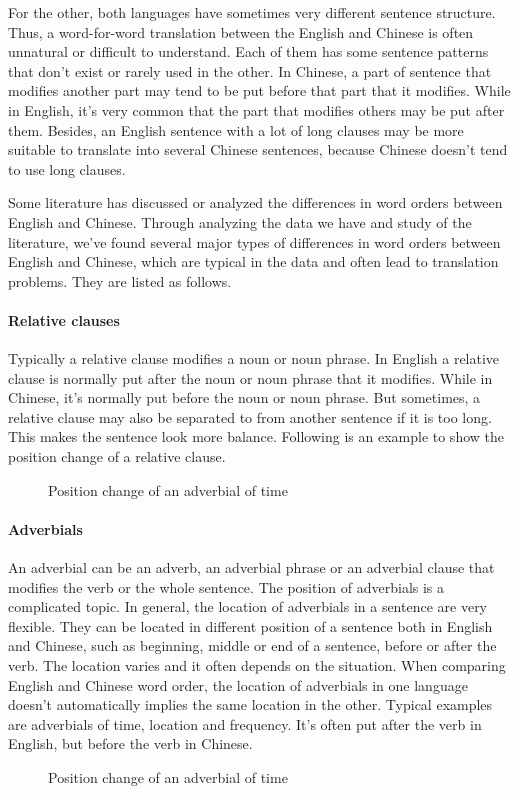 For the other, both languages have sometimes very different sentence structure. Thus, a word-for-word translation between the English and Chinese is often unnatural or difficult to understand. Each of them has some sentence patterns that don't exist or rarely used in the other. In Chinese, a part of sentence that modifies another part may tend to be put before that part that it modifies. While in English, it's very common that the part that modifies others may be put after them. Besides, an English sentence with a lot of long clauses may be more suitable to translate into several Chinese sentences, because Chinese doesn't tend to use long clauses. 

Some literature \citep{syntactic} has discussed or analyzed the differences in word orders between English and Chinese. Through analyzing the data we have and study of the literature, we've found several major types of differences in word orders between English and Chinese, which are typical in the data and often lead to translation problems. They are listed as follows.

\paragraph{Relative clauses}
Typically a relative clause modifies a noun or noun phrase. In English a relative clause is normally put after the noun or noun phrase that it modifies. While in Chinese, it's normally put before the noun or noun phrase. But sometimes, a relative clause may also be separated to from another sentence if it is too long. This makes the sentence look more balance. Following is an example to show the position change of a relative clause.
\begin{figure}[H]
\centering

\caption{Position change of an adverbial of time}
\end{figure}

\paragraph{Adverbials}
An adverbial can be an adverb, an adverbial phrase or an adverbial clause that modifies the verb or the whole sentence. The position of adverbials is a complicated topic. In general, the location of adverbials in a sentence are very flexible. They can be located in different position of a sentence both in English and Chinese, such as beginning, middle or end of a sentence, before or after the verb. The location varies and it often depends on the situation. When comparing English and Chinese word order, the location of adverbials in one language doesn't automatically implies the same location in the other. Typical examples are adverbials of time, location and frequency. It's often put after the verb in English, but before the verb in Chinese. 
\begin{figure}[H]
\centering

\caption{Position change of an adverbial of time}
\end{figure}

